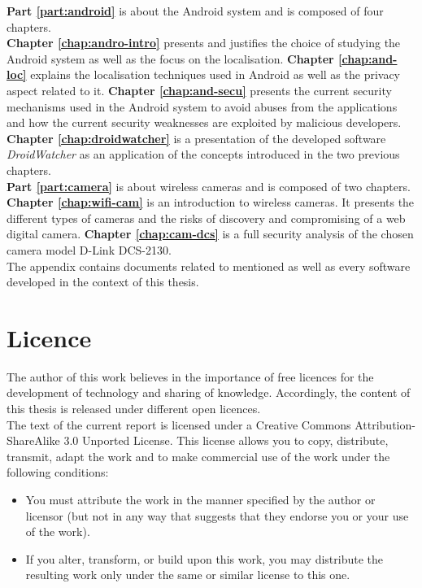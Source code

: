 \textbf{Part \ref{part:android}} is about the Android system and is composed of four chapters.\\

\textbf{Chapter \ref{chap:andro-intro}} presents and justifies the choice of studying the Android system as well as the focus on the localisation.
\textbf{Chapter \ref{chap:and-loc}} explains the localisation techniques used in Android as well as the privacy aspect related to it.
\textbf{Chapter \ref{chap:and-secu}} presents the current security mechanisms used in the Android system to avoid abuses from the applications and how the current security weaknesses are exploited by malicious developers.
\textbf{Chapter \ref{chap:droidwatcher}} is a presentation of the developed software \emph{DroidWatcher} as an application of the concepts introduced in the two previous chapters.\\

\textbf{Part \ref{part:camera}} is about wireless cameras and is composed of two chapters.\\

\textbf{Chapter \ref{chap:wifi-cam}} is an introduction to wireless cameras.
It presents the different types of cameras and the risks of discovery and compromising of a web digital camera.
\textbf{Chapter \ref{chap:cam-dcs}} is a full security analysis of the chosen camera model D-Link DCS-2130.\\

The appendix contains documents related to mentioned as well as every software developed in the context of this thesis.

\section{Licence}

The author of this work believes in the importance of free licences for the development of technology and sharing of knowledge.
Accordingly, the content of this thesis is released under different open licences.\\

The text of the current report is licensed under a Creative Commons Attribution-ShareAlike 3.0 Unported License.
This license allows you to copy, distribute, transmit, adapt the work and to make commercial use of the work under the following conditions:

\begin{itemize}
\item You must attribute the work in the manner specified by the author or licensor (but not in any way that suggests that they endorse you or your use of the work).
\item  If you alter, transform, or build upon this work, you may distribute the resulting work only under the same or similar license to this one. 
\end{itemize}

